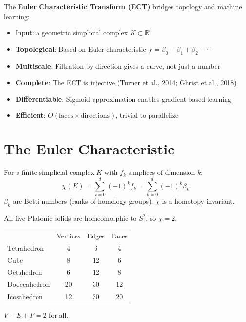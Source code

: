 The \textbf{Euler Characteristic Transform (ECT)} bridges topology and machine learning: \cite{rieck2025topology}
\begin{itemize}
    \item Input: a geometric simplicial complex $K \subset \mathbb{R}^d$
    \item \textbf{Topological}: Based on Euler characteristic $\chi = \beta_0 - \beta_1 + \beta_2 - \cdots$
    \item \textbf{Multiscale}: Filtration by direction gives a curve, not just a number
    \item \textbf{Complete}: The ECT is injective (Turner et al., 2014; Ghrist et al., 2018)
    \item \textbf{Differentiable}: Sigmoid approximation enables gradient-based learning
    \item \textbf{Efficient}: $O(\text{faces} \times \text{directions})$, trivial to parallelize
\end{itemize}

\section{The Euler Characteristic} \cite{rieck2025topology}
\label{sec:ect:euler}

\begin{definition} \cite{rieck2025topology}
For a finite simplicial complex $K$ with $f_k$ simplices of dimension $k$:
\[
\chi(K) = \sum_{k=0}^d (-1)^k f_k = \sum_{k=0}^d (-1)^k \beta_k.
\]
$\beta_k$ are Betti numbers (ranks of homology groups). $\chi$ is a homotopy invariant.
\end{definition}

\begin{example}
All five Platonic solids are homeomorphic to $S^2$, so $\chi = 2$.
\begin{center}
\begin{tabular}{lccc}
 & Vertices & Edges & Faces \\
Tetrahedron & 4 & 6 & 4 \\
Cube & 8 & 12 & 6 \\
Octahedron & 6 & 12 & 8 \\
Dodecahedron & 20 & 30 & 12 \\
Icosahedron & 12 & 30 & 20 \\
\end{tabular}
\end{center}
$V - E + F = 2$ for all.
\end{example}

